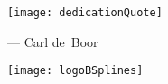 \thispagestyle{empty}

\vspace*{\fill}

\begin{center}
  \texttt{[image: dedicationQuote]}
  
  \begin{minipage}{0.6\textwidth}%
    \begin{flushright}
      \small--- Carl de~Boor \cite{Boor16Comment}
    \end{flushright}
  \end{minipage}
\end{center}

\vspace*{\fill}

\begin{center}
  \texttt{[image: logoBSplines]}%
\end{center}

\vspace*{\fill}

\cleardoublepage
